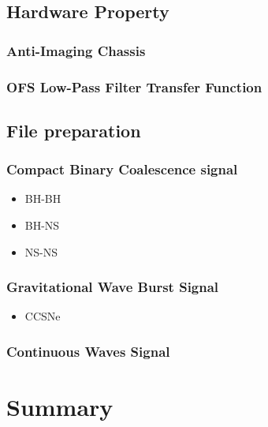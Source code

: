 \subsection{Hardware Property}
	\subsubsection{Anti-Imaging Chassis}
	\subsubsection{OFS Low-Pass Filter Transfer Function}

\subsection{File preparation}
	\subsubsection{Compact Binary Coalescence signal}
		\begin{itemize}
			\item BH-BH
			\item BH-NS
			\item NS-NS\\
		\end{itemize}
	\subsubsection{Gravitational Wave Burst Signal}
		\begin{itemize}
			\item CCSNe
		\end{itemize}
	\subsubsection{Continuous Waves Signal}




\subsection{}
\section{Summary}


